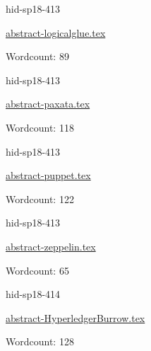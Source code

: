 

\begin{IU}

hid-sp18-413

\href{https://github.com/cloudmesh-community/hid-sp18-413/blob/master//technology/abstract-logicalglue.tex}{abstract-logicalglue.tex}

 

Wordcount: 89

\end{IU}



\begin{IU}

hid-sp18-413

\href{https://github.com/cloudmesh-community/hid-sp18-413/blob/master//technology/abstract-paxata.tex}{abstract-paxata.tex}

 

Wordcount: 118

\end{IU}



\begin{IU}

hid-sp18-413

\href{https://github.com/cloudmesh-community/hid-sp18-413/blob/master//technology/abstract-puppet.tex}{abstract-puppet.tex}

 

Wordcount: 122

\end{IU}



\begin{IU}

hid-sp18-413

\href{https://github.com/cloudmesh-community/hid-sp18-413/blob/master//technology/abstract-zeppelin.tex}{abstract-zeppelin.tex}

 

Wordcount: 65

\end{IU}



\begin{IU}

hid-sp18-414

\href{https://github.com/cloudmesh-community/hid-sp18-414/blob/master//technology/abstract-HyperledgerBurrow.tex}{abstract-HyperledgerBurrow.tex}

 

Wordcount: 128

\end{IU}


